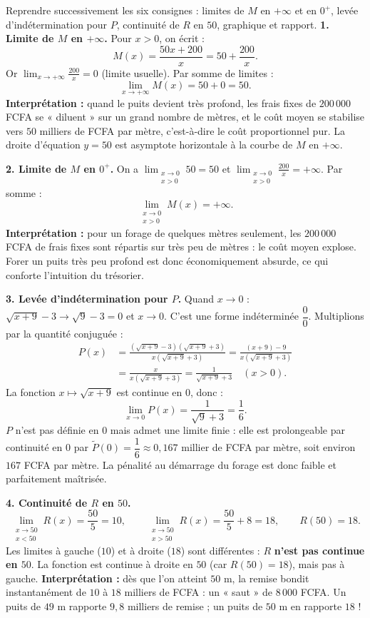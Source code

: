 \documentclass[11pt]{article}
\newcommand{\cle}[1]{{\popxbold\color{popdark}#1}}
\begin{document}
\begin{exoresolu}
Reprendre successivement les six consignes : limites de $M$ en $+\infty$ et en $0^+$, levée d'indétermination pour $P$, continuité de $R$ en $50$, graphique et rapport.
\tcblower
\textbf{1. Limite de $M$ en $+\infty$.} Pour $x > 0$, on écrit :
\[ M(x) = \frac{50x + 200}{x} = 50 + \frac{200}{x}. \]
Or $\displaystyle\lim_{x \to +\infty} \frac{200}{x} = 0$ (limite usuelle). Par somme de limites :
\[ \lim_{x \to +\infty} M(x) = 50 + 0 = 50. \]
\textbf{Interprétation :} quand le puits devient très profond, les frais fixes de $200\,000$ FCFA se « diluent » sur un grand nombre de mètres, et le coût moyen se stabilise vers $50$ milliers de FCFA par mètre, c'est-à-dire le coût proportionnel pur. La droite d'équation $y = 50$ est \cle{asymptote horizontale} à la courbe de $M$ en $+\infty$.

\textbf{2. Limite de $M$ en $0^+$.} On a $\displaystyle\lim_{\substack{x \to 0 \\ x>0}} 50 = 50$ et $\displaystyle\lim_{\substack{x \to 0 \\ x>0}} \frac{200}{x} = +\infty$. Par somme :
\[ \lim_{\substack{x \to 0 \\ x > 0}} M(x) = +\infty. \]
\textbf{Interprétation :} pour un forage de quelques mètres seulement, les $200\,000$ FCFA de frais fixes sont répartis sur très peu de mètres : le coût moyen explose. Forer un puits très peu profond est donc économiquement absurde, ce qui conforte l'intuition du trésorier.

\textbf{3. Levée d'indétermination pour $P$.} Quand $x \to 0$ : $\sqrt{x+9} - 3 \to \sqrt{9} - 3 = 0$ et $x \to 0$. C'est une forme indéterminée $\dfrac{0}{0}$. Multiplions par la quantité conjuguée :
\begin{align*}
P(x) &= \frac{(\sqrt{x+9}-3)(\sqrt{x+9}+3)}{x(\sqrt{x+9}+3)} = \frac{(x+9) - 9}{x(\sqrt{x+9}+3)} \\
&= \frac{x}{x(\sqrt{x+9}+3)} = \frac{1}{\sqrt{x+9}+3} \quad (x > 0).
\end{align*}
La fonction $x \mapsto \sqrt{x+9}$ est continue en $0$, donc :
\[ \lim_{x \to 0} P(x) = \frac{1}{\sqrt{9}+3} = \frac{1}{6}. \]
$P$ n'est pas définie en $0$ mais admet une limite finie : elle est \cle{prolongeable par continuité} en $0$ par $\tilde{P}(0) = \dfrac{1}{6} \approx 0,167$ millier de FCFA par mètre, soit environ $167$ FCFA par mètre. La pénalité au démarrage du forage est donc faible et parfaitement maîtrisée.

\textbf{4. Continuité de $R$ en $50$.}
\[ \lim_{\substack{x \to 50 \\ x < 50}} R(x) = \frac{50}{5} = 10, \qquad \lim_{\substack{x \to 50 \\ x > 50}} R(x) = \frac{50}{5} + 8 = 18, \qquad R(50) = 18. \]
Les limites à gauche ($10$) et à droite ($18$) sont différentes : $R$ \textbf{n'est pas continue en $50$}. La fonction est continue à droite en $50$ (car $R(50) = 18$), mais pas à gauche. \textbf{Interprétation :} dès que l'on atteint $50$ m, la remise bondit instantanément de $10$ à $18$ milliers de FCFA : un « saut » de $8\,000$ FCFA. Un puits de $49$ m rapporte $9,8$ milliers de remise ; un puits de $50$ m en rapporte $18$ !


\end{exoresolu}
\end{document}
